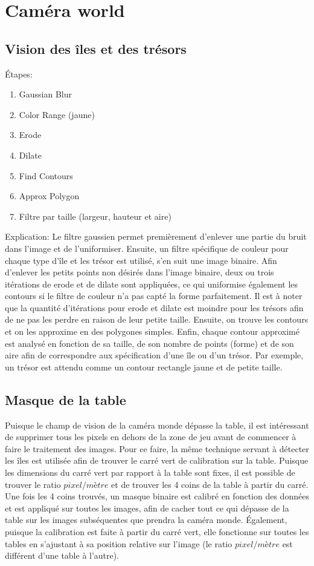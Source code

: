 \section{Caméra world} 

\subsection{Vision des îles et des trésors}

Étapes:
\begin{enumerate}
\item Gaussian Blur
\item Color Range (jaune)
\item Erode
\item Dilate
\item Find Contours
\item Approx Polygon
\item Filtre par taille (largeur, hauteur et aire)
\end{enumerate}

Explication: Le filtre gaussien permet premièrement d'enlever une partie du bruit dans l'image et de l'uniformiser. Ensuite, un filtre spécifique de couleur pour chaque type d'île et les trésor est utilisé, s'en suit une image binaire. Afin d'enlever les petits points non désirés dans l'image binaire, deux ou trois itérations de erode et de dilate sont appliquées, ce qui uniformise également les contours si le filtre de couleur n'a pas capté la forme parfaitement. Il est à noter que la quantité d'itérations pour erode et dilate est moindre pour les trésors afin de ne pas les perdre en raison de leur petite taille. Ensuite, on trouve les contours et on les approxime en des polygones simples. Enfin, chaque contour approximé est analysé en fonction de sa taille, de son nombre de points (forme) et de son aire afin de correspondre aux spécification d'une île ou d'un trésor. Par exemple, un trésor est attendu comme un contour rectangle jaune et de petite taille.

\subsection{Masque de la table}

Puisque le champ de vision de la caméra monde dépasse la table, il est intéressant de supprimer tous les pixels en dehors de la zone de jeu avant de commencer à faire le traitement des images. Pour ce faire, la même technique servant à détecter les îles est utilisée afin de trouver le carré vert de calibration sur la table. Puisque les dimensions du carré vert par rapport à la table sont fixes, il est possible de trouver le ratio $pixel/mètre$ et de trouver les 4 coins de la table à partir du carré. Une fois les 4 coins trouvés, un masque binaire est calibré en fonction des données et est appliqué sur toutes les images, afin de cacher tout ce qui dépasse de la table sur les images subséquentes que prendra la caméra monde. Également, puisque la calibration est faite à partir du carré vert, elle fonctionne sur toutes les tables en s'ajustant à sa position relative sur l'image (le ratio $pixel/mètre$ est différent d'une table à l'autre).

